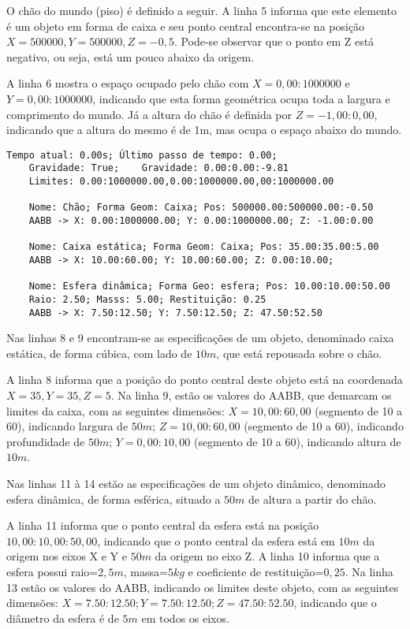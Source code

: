\documentclass[12pt]{article}
\begin{document}
O chão do mundo (piso) é definido a seguir. A linha 5 informa que este elemento é um objeto em forma de caixa e seu ponto central encontra-se na posição $X=500000, Y=500000, Z=-0,5$. Pode-se observar que o ponto em Z está negativo, ou seja, está um pouco abaixo da origem. 

A linha 6 mostra o espaço ocupado pelo chão com $X=0,00:1000000$ e $Y=0,00:1000000$, indicando que esta forma geométrica ocupa toda a largura e comprimento do mundo. Já a altura do chão é  definida por $Z=-1,00:0,00$, indicando que a altura do mesmo é de 1m, mas ocupa o espaço abaixo do mundo.

\begin{lstlisting}[frame=single,caption=Registro Acessível: Inicialização do ambiente\label{lg:init_world}]
	Tempo atual: 0.00s; Último passo de tempo: 0.00; 
	Gravidade: True; 	Gravidade: 0.00:0.00:-9.81
	Limites: 0.00:1000000.00,0.00:1000000.00,00:1000000.00

	Nome: Chão; Forma Geom: Caixa; Pos: 500000.00:500000.00:-0.50
	AABB -> X: 0.00:1000000.00; Y: 0.00:1000000.00; Z: -1.00:0.00
		
	Nome: Caixa estática; Forma Geom: Caixa; Pos: 35.00:35.00:5.00
	AABB -> X: 10.00:60.00; Y: 10.00:60.00; Z: 0.00:10.00; 
	
	Nome: Esfera dinâmica; Forma Geo: esfera; Pos: 10.00:10.00:50.00
	Raio: 2.50; Masss: 5.00; Restituição: 0.25
	AABB -> X: 7.50:12.50; Y: 7.50:12.50; Z: 47.50:52.50
\end{lstlisting}

Nas linhas 8 e 9 encontram-se as especificações de um objeto, denominado caixa estática, de forma cúbica, com lado de $10m$, que está repousada sobre o chão.

A linha 8 informa que a posição do ponto central deste objeto está na coordenada $X=35,Y=35,Z=5$. Na linha 9, estão os valores do AABB, que demarcam os limites da caixa, com as seguintes dimensões: $X=10,00:60,00$ (segmento de 10 a 60), indicando largura de $50m$; $Z=10,00:60,00$ (segmento de 10 a 60), indicando profundidade de $50m$; $Y=0,00:10,00$ (segmento de 10 a 60), indicando altura de $10m$.

Nas linhas 11 à 14 estão as especificações de um objeto dinâmico, denominado esfera dinâmica, de forma esférica, situado a $50m$ de altura a partir do chão. 

A linha 11 informa que o ponto central da esfera está na posição $10,00:10,00:50,00$, indicando que o ponto central da esfera está em $10m$ da origem nos eixos X e Y e $50m$ da origem no eixo Z. A linha 10 informa que a esfera possui raio=$2,5m$, massa=$5kg$ e coeficiente de restituição=$0,25$. Na linha 13 estão os valores do AABB, indicando os limites deste objeto, com as seguintes dimensões: $X=7.50:12.50;Y=7.50:12.50;Z=47.50:52.50$, indicando que o diâmetro da esfera é de $5m$ em todos os eixos.
\end{document}
